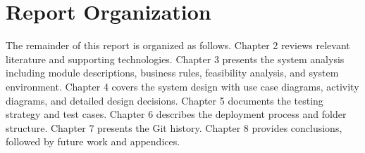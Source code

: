 \section{Report Organization}
The remainder of this report is organized as follows. Chapter 2 reviews relevant literature and supporting technologies. Chapter 3 presents the system analysis including module descriptions, business rules, feasibility analysis, and system environment. Chapter 4 covers the system design with use case diagrams, activity diagrams, and detailed design decisions. Chapter 5 documents the testing strategy and test cases. Chapter 6 describes the deployment process and folder structure. Chapter 7 presents the Git history. Chapter 8 provides conclusions, followed by future work and appendices.

